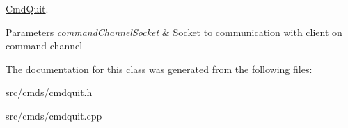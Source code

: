 \hyperlink{classCmdQuit}{Cmd\+Quit}. 


\begin{DoxyParams}{Parameters}
{\em command\+Channel\+Socket} & Socket to communication with client on command channel \\
\hline
\end{DoxyParams}


The documentation for this class was generated from the following files\+:\begin{DoxyCompactItemize}
\item 
src/cmds/cmdquit.\+h\item 
src/cmds/cmdquit.\+cpp\end{DoxyCompactItemize}
